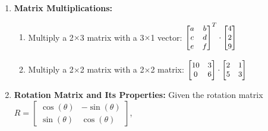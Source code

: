 \documentclass{16384_doc}
\begin{document}
\begin{enumerate}[label=\textbf{Question \alph*},leftmargin=*, align=left]
\begin{enumerate}[label=(\roman*)]
    \end{enumerate}

    \begin{tcolorbox}[height=15cm]
    \end{tcolorbox}

    \vspace{24pt}

    \item[\textbf{Question b (10 points)}] \textbf{Matrix Multiplications:}
    \begin{enumerate}[label=(\roman*)]
        \item Multiply a 2$\times$3 matrix with a 3$\times$1 vector: $\small \begin{bmatrix} a & b \\ c & d \\ e & f \end{bmatrix}^T \cdot \begin{bmatrix} 4 \\ 2 \\ 9 \end{bmatrix}$
        
        \item Multiply a 2$\times$2 matrix with a 2$\times$2 matrix: $\small \begin{bmatrix} 10 & 3 \\ 0 & 6 \end{bmatrix} \cdot \begin{bmatrix} 2 & 1 \\ 5 & 3 \end{bmatrix}$
    \end{enumerate}

    \begin{tcolorbox}[height=20cm]
    \end{tcolorbox}

    \item[\textbf{Question c (15 points)}] \textbf{Rotation Matrix and Its Properties:}
Given the rotation matrix $R = \begin{bmatrix} \cos(\theta) & -\sin(\theta) \\ \sin(\theta) & \cos(\theta) \end{bmatrix}$,
    

\end{enumerate}
\end{document}
